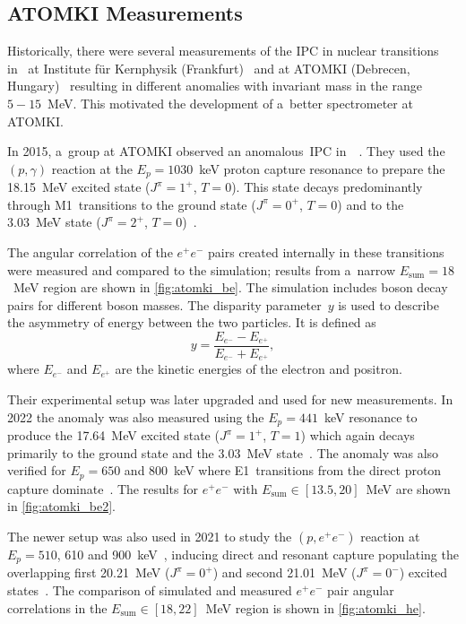 		\subsection{ATOMKI Measurements}
			Historically, there were several measurements of the \ac{IPC} in nuclear transitions in~ at Institute für Kernphysik (Frankfurt)~\cite{ikf1996,ikf1997,ikf2001} and at ATOMKI (Debrecen, Hungary)~\cite{atomki2008,atomki2012} resulting in different anomalies with invariant mass in the range $5-15$~MeV. This motivated the development of a~better spectrometer at ATOMKI.
		
			In 2015, a~group at ATOMKI observed an anomalous~\ac{IPC} in~~\cite{atomki_be}. They used the $(p,\gamma)$ reaction at the $E_p = 1030$~keV proton capture resonance to prepare the 18.15~MeV excited state ($J^\pi = 1^{+}$, $T=0$). This state decays predominantly through M1~transitions to the ground state ($J^\pi = 0^{+}$, $T=0$) and to the 3.03~MeV state ($J^\pi = 2^{+}$, $T=0$)~\cite{resonances}.
			
			The angular correlation of the $e^+ e^-$ pairs created internally in these transitions were measured and compared to the simulation; results from a~narrow $E_\text{sum}=18$~MeV region are shown in \cref{fig:atomki_be}. The simulation includes boson decay pairs for different boson masses. The disparity parameter~$y$ is used to describe the asymmetry of energy between the two particles. It is defined as
				\begin{equation}
					\label{eq:dispar}
					y = \frac{E_{e^-}-E_{e^+}}{E_{e^-}+E_{e^+}},
				\end{equation}
			where $E_{e^-}$ and $E_{e^+}$ are the kinetic energies of the electron and positron.
			
			Their experimental setup was later upgraded and used for new measurements. In 2022 the  anomaly was also measured using the $E_p = 441$~keV resonance to produce the 17.64~MeV excited state ($J^\pi = 1^{+}$, $T=1$) which again decays primarily to the ground state and the 3.03~MeV state~\cite{resonances}. The anomaly was also verified for $E_p = 650$ and 800~keV where E1~transitions from the direct proton capture dominate~\cite{atomki_be2}. The results for $e^+e^-$ with ${E_\text{sum}\in[13.5,20]}$~MeV are shown in \cref{fig:atomki_be2}.
			
			The newer setup was also used in 2021 to study the $(p,e^+ e^-)$ reaction at $E_p = 510$, 610 and 900~keV~\cite{atomki_he2}, inducing direct and resonant capture populating the overlapping first 20.21~MeV ($J^\pi = 0^+$) and second 21.01~MeV ($J^\pi = 0^-$) excited states~\cite{resonances2}. The comparison of simulated and measured $e^+e^-$ pair angular correlations in the ${E_\text{sum}\in[18,22]}$~MeV region is shown in \cref{fig:atomki_he}.
			
